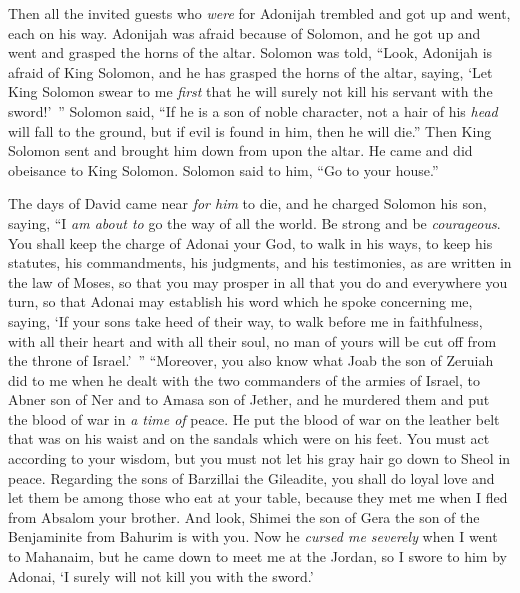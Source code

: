 \begin{biblechapter}
\verse Then all the invited guests who \textit{were} for Adonijah trembled and got up and went, each on his way.
\verse Adonijah was afraid because of Solomon, and he got up and went and grasped the horns of the altar.
\verse Solomon was told, “Look, Adonijah is afraid of King Solomon, and he has grasped the horns of the altar, saying, ‘Let King Solomon swear to me \textit{first} that he will surely not kill his servant with the sword!’ ”
\verse Solomon said, “If he is a son of noble character, not a hair of his \textit{head} will fall to the ground, but if evil is found in him, then he will die.”
\verse Then King Solomon sent and brought him down from upon the altar. He came and did obeisance to King Solomon. Solomon said to him, “Go to your house.”
\end{biblechapter}

\begin{biblechapter} %
 The days of David came near \textit{for him} to die, and he charged Solomon his son, saying,
\verse “I \textit{am about to} go the way of all the world. Be strong and be \textit{courageous}.
\verse You shall keep the charge of Adonai your God, to walk in his ways, to keep his statutes, his commandments, his judgments, and his testimonies, as are written in the law of Moses, so that you may prosper in all that you do and everywhere you turn,
\verse so that Adonai may establish his word which he spoke concerning me, saying, ‘If your sons take heed of their way, to walk before me in faithfulness, with all their heart and with all their soul, no man of yours will be cut off from the throne of Israel.’ ”
\verse “Moreover, you also know what Joab the son of Zeruiah did to me when he dealt with the two commanders of the armies of Israel, to Abner son of Ner and to Amasa son of Jether, and he murdered them and put the blood of war in \textit{a time of} peace. He put the blood of war on the leather belt that was on his waist and on the sandals which were on his feet.
\verse You must act according to your wisdom, but you must not let his gray hair go down to Sheol in peace.
\verse Regarding the sons of Barzillai the Gileadite, you shall do loyal love and let them be among those who eat at your table, because they met me when I fled from Absalom your brother.
\verse And look, Shimei the son of Gera the son of the Benjaminite from Bahurim is with you. Now he \textit{cursed me severely} when I went to Mahanaim, but he came down to meet me at the Jordan, so I swore to him by Adonai, ‘I surely will not kill you with the sword.’

\end{biblechapter}
